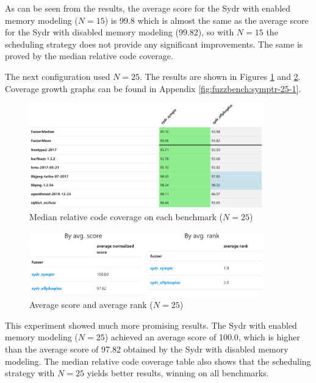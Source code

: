As can be seen from the results, the average score for the Sydr with enabled memory modeling ($N=15$) is 99.8 which is almost the same as the average score for the Sydr with disabled memory modeling (99.82), so with $N=15$ the scheduling strategy does not provide any significant improvements. The same is proved by the median relative code coverage.


The next configuration used $ N = 25 $. The results are shown in Figures \ref{fig:fuzzbench-symptr-25-1-coverage} and \ref{fig:fuzzbench-symptr-25-1-score-rank}. Coverage growth graphs can be found in Appendix \ref{fig:fuzzbench:symptr-25-1}.

\begin{figure}[h]
    \centering
    \includegraphics[width=0.9\textwidth]{assets/fuzzbench/symptr-25-1/median-relative-code-coverage-on-each-benchmark.png}
    \caption{Median relative code coverage on each benchmark ($N=25$)}
    \label{fig:fuzzbench-symptr-25-1-coverage}
\end{figure}

\begin{figure}[h]
    \centering
    \includegraphics[width=0.9\textwidth]{assets/fuzzbench/symptr-25-1/avg-score-avg-rank.png}
    \caption{Average score and average rank ($N=25$)}
    \label{fig:fuzzbench-symptr-25-1-score-rank}
\end{figure}

This experiment showed much more promising results. The Sydr with enabled memory modeling ($N=25$) achieved an average score of 100.0, which is higher than the average score of 97.82 obtained by the Sydr with disabled memory modeling. The median relative code coverage table also shows that the scheduling strategy with $N=25$ yields better results, winning on all benchmarks.

